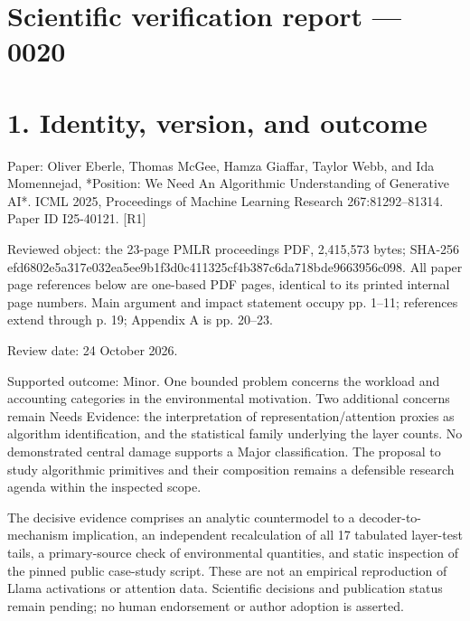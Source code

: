 \documentclass[10pt]{article}
\begin{document}
\section*{Scientific verification report — 0020}
\section*{1. Identity, version, and outcome}
Paper: Oliver Eberle, Thomas McGee, Hamza Giaffar, Taylor Webb, and Ida Momennejad, *Position: We Need An Algorithmic Understanding of Generative AI*. ICML 2025, Proceedings of Machine Learning Research 267:81292–81314. Paper ID I25-40121. [R1]\par
Reviewed object: the 23-page PMLR proceedings PDF, 2,415,573 bytes; SHA-256 efd6802e5a317e032ea5ee9b1f3d0c411325cf4b387c6da718bde9663956c098. All paper page references below are one-based PDF pages, identical to its printed internal page numbers. Main argument and impact statement occupy pp. 1–11; references extend through p. 19; Appendix A is pp. 20–23.\par
Review date: 24 October 2026.\par
Supported outcome: Minor. One bounded problem concerns the workload and accounting categories in the environmental motivation. Two additional concerns remain Needs Evidence: the interpretation of representation/attention proxies as algorithm identification, and the statistical family underlying the layer counts. No demonstrated central damage supports a Major classification. The proposal to study algorithmic primitives and their composition remains a defensible research agenda within the inspected scope.\par
The decisive evidence comprises an analytic countermodel to a decoder-to-mechanism implication, an independent recalculation of all 17 tabulated layer-test tails, a primary-source check of environmental quantities, and static inspection of the pinned public case-study script. These are not an empirical reproduction of Llama activations or attention data. Scientific decisions and publication status remain pending; no human endorsement or author adoption is asserted.\par
\end{document}
